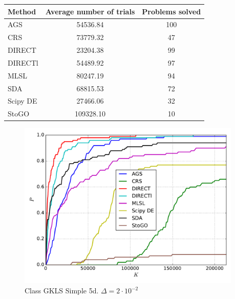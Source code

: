 \documentclass[a4paper]{article}
\begin{document}
\begin{tabular}{lcc}
\hline
 Method   &  Average number of trials  &  Problems solved  \\
\hline
 AGS      &          54536.84          &        100        \\
 CRS      &          73779.32          &        47         \\
 DIRECT   &          23204.38          &        99         \\
 DIRECTl  &          54489.92          &        97         \\
 MLSL     &          80247.19          &        94         \\
 SDA      &          68815.53          &        72         \\
 Scipy DE &          27466.06          &        32         \\
 StoGO    &         109328.10          &        10         \\
\hline
\end{tabular}
\begin{figure}[H]
  \center
  \includegraphics[width=0.95\textwidth]{../experiments/gklss5d/cmc.pdf}
  \caption{Class GKLS Simple 5d. $\Delta=2\cdot10^{-2}$}
\end{figure}
\end{document}
